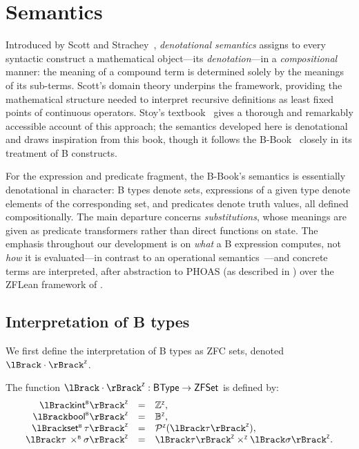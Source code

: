 \section{Semantics}
\label{sec:b-semantics}

Introduced by Scott and Strachey~\cite{scottStrachey1971}, \emph{denotational semantics} assigns to
every syntactic construct a mathematical object---its \emph{denotation}---in a \emph{compositional}
manner: the meaning of a compound term is determined solely by the meanings of its sub-terms.
Scott's domain theory underpins the framework, providing the mathematical structure needed to
interpret recursive definitions as least fixed points of continuous operators.
Stoy's textbook~\cite{stoy1977} gives a thorough and remarkably accessible account of this
approach; the semantics developed here is denotational and draws inspiration from this book,
though it follows the B-Book~\cite{abrial1996bbook} closely in its treatment of B constructs.

For the expression and predicate fragment, the B-Book's semantics is essentially denotational
in character: B types denote sets, expressions of a given type denote elements of the
corresponding set, and predicates denote truth values, all defined compositionally.
The main departure concerns \emph{substitutions}, whose meanings are given as predicate
transformers rather than direct functions on state.
The emphasis throughout our development is on \emph{what} a B expression computes, not \emph{how} it is
evaluated---in contrast to an operational semantics~\cite{plotkin2004sos}---and concrete
terms are interpreted, after abstraction to PHOAS (as described in ) over the ZFLean framework of .

\subsection{Interpretation of B types}
\label{subsec:b-type-interp}

We first define the interpretation of B types as ZFC sets, denoted \(\regnotation{\interpZ{\cdot}}\).

\begin{definition}
  \label{def:b-type-interp}
          The function $\interpZ{\cdot} : \mathsf{BType} \to \mathsf{ZFSet}$ is defined by:
  \[
    \begin{array}{rcl}
      \interpZ{\intB}              & = & \Zint,                                   \\
      \interpZ{\boolB}             & = & \Zbool,                                  \\
      \interpZ{\setB\tau}          & = & \powZ(\interpZ{\tau}),                   \\
      \interpZ{\tau \prodB \sigma} & = & \interpZ{\tau} \timesZ \interpZ{\sigma}.
    \end{array}
  \]
\end{definition}

